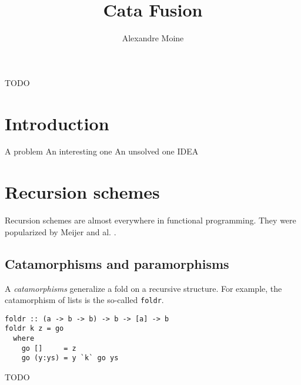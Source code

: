 \documentclass[format=sigplan]{acmart}
\newcommand{\minline}[1]{\texttt{#1}}
\begin{document}
\title{Cata Fusion}
\author{Alexandre Moine}


\begin{abstract}
\end{abstract}
	
%
%
\begin{CCSXML}
TODO
\end{CCSXML}
	
	
%
	
	
%
\maketitle

\section{Introduction}

A problem
An interesting one
An unsolved one
IDEA
	
\section{Recursion schemes}
Recursion schemes are almost everywhere in functional programming. They were popularized by Meijer and al. \cite{4cec4a43c86444479dc0003182424795}.

\subsection{Catamorphisms and paramorphisms}
A \emph{catamorphisms} generalize a fold on a recursive structure. For example, the catamorphism of lists is the so-called \minline{foldr}.
\begin{verbatim}
foldr :: (a -> b -> b) -> b -> [a] -> b
foldr k z = go
  where
    go []     = z
    go (y:ys) = y `k` go ys

\end{verbatim}
TODO
\end{document}
